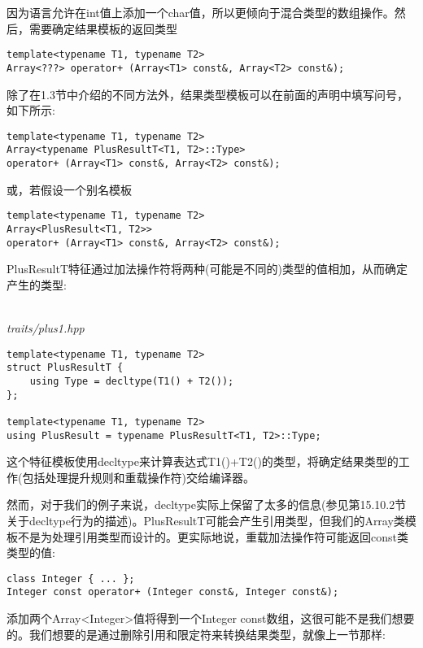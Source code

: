 因为语言允许在int值上添加一个char值，所以更倾向于混合类型的数组操作。然后，需要确定结果模板的返回类型

\begin{lstlisting}[style=styleCXX]
template<typename T1, typename T2>
Array<???> operator+ (Array<T1> const&, Array<T2> const&);
\end{lstlisting}

除了在1.3节中介绍的不同方法外，结果类型模板可以在前面的声明中填写问号，如下所示:

\begin{lstlisting}[style=styleCXX]
template<typename T1, typename T2>
Array<typename PlusResultT<T1, T2>::Type>
operator+ (Array<T1> const&, Array<T2> const&);
\end{lstlisting}

或，若假设一个别名模板

\begin{lstlisting}[style=styleCXX]
template<typename T1, typename T2>
Array<PlusResult<T1, T2>>
operator+ (Array<T1> const&, Array<T2> const&);
\end{lstlisting}

PlusResultT特征通过加法操作符将两种(可能是不同的)类型的值相加，从而确定产生的类型:

\hspace*{\fill} \\ %
\noindent
\textit{traits/plus1.hpp}
\begin{lstlisting}[style=styleCXX]
template<typename T1, typename T2>
struct PlusResultT {
	using Type = decltype(T1() + T2());
};

template<typename T1, typename T2>
using PlusResult = typename PlusResultT<T1, T2>::Type;
\end{lstlisting}

这个特征模板使用decltype来计算表达式T1()+T2()的类型，将确定结果类型的工作(包括处理提升规则和重载操作符)交给编译器。

然而，对于我们的例子来说，decltype实际上保留了太多的信息(参见第15.10.2节关于decltype行为的描述)。PlusResultT可能会产生引用类型，但我们的Array类模板不是为处理引用类型而设计的。更实际地说，重载加法操作符可能返回const类类型的值:

\begin{lstlisting}[style=styleCXX]
class Integer { ... };
Integer const operator+ (Integer const&, Integer const&);
\end{lstlisting}

添加两个Array<Integer>值将得到一个Integer const数组，这很可能不是我们想要的。我们想要的是通过删除引用和限定符来转换结果类型，就像上一节那样:


